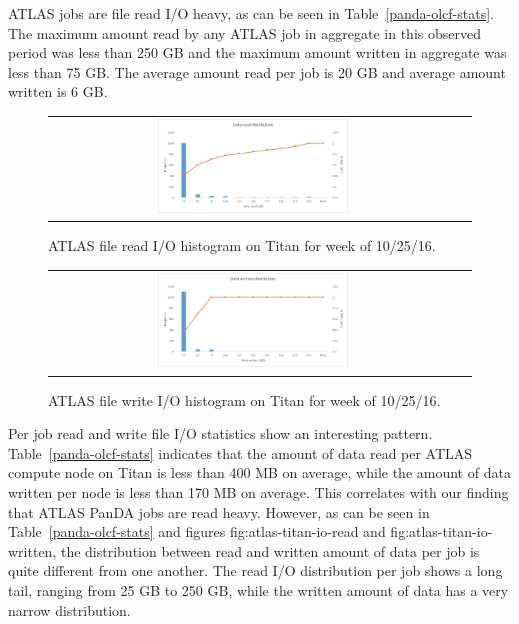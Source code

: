 ATLAS jobs are file read I/O heavy, as can be seen in
Table~\ref{panda-olcf-stats}. The maximum amount read by any ATLAS job in
aggregate in this observed period was less than 250 GB and the maximum amount
written in aggregate was less than 75 GB\@. The average amount read per job is
20 GB and average amount written is 6 GB\@.

\begin{figure}[!htb]
    \centering
    \begin{tabular}{cc}
        {\includegraphics[width=0.48\textwidth]{figures/panda_data_read_hist.pdf}}\\
    \end{tabular}
    \caption{ATLAS file read I/O histogram on Titan for week of 10/25/16.}
\label{fig:atlas-titan-io-read}
\end{figure}



\begin{figure}[!htb]
    \centering
    \begin{tabular}{cc}
        {\includegraphics[width=0.48\textwidth]{figures/panda_data_written_hist.pdf}}\\
    \end{tabular}
    \caption{ATLAS file write I/O histogram on Titan for week of 10/25/16.}
\label{fig:atlas-titan-io-written}
\end{figure}


Per job read and write file I/O statistics show an interesting pattern.
Table~\ref{panda-olcf-stats} indicates that the amount of data read per ATLAS
compute node on Titan is less than 400 MB on average, while the amount of data
written per node is less than 170 MB on average. This correlates with our
finding that ATLAS PanDA jobs are read heavy. However, as can be seen in
Table~\ref{panda-olcf-stats} and figures {fig:atlas-titan-io-read} and
{fig:atlas-titan-io-written}, the distribution between read and written amount
of data per job is quite different from one another. The read I/O distribution
per job shows a long tail, ranging from 25 GB to 250 GB, while the written
amount of data has a very narrow distribution.

